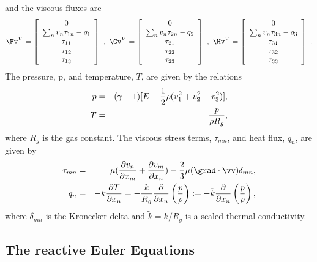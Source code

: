 \documentclass{article}
\begin{document}
and the viscous fluxes are
$$
 \Fv^V = \left[ \begin{array}{c}
    0 \\ \sum_n v_n\tau_{1n}-q_1
      \\ \tau_{11} \\  \tau_{12} \\ \tau_{13}
                \end{array}\right]  ~,~
 \Gv^V = \left[ \begin{array}{c}
    0 \\ \sum_n v_n\tau_{2n}-q_2
      \\ \tau_{21} \\  \tau_{22} \\ \tau_{23}
                \end{array}\right] ~,~
 \Hv^V = \left[ \begin{array}{c}
    0 \\ \sum_n v_n\tau_{3n}-q_3
      \\ \tau_{31} \\  \tau_{32} \\ \tau_{33}
                \end{array}\right]   ~.
$$
The pressure, p, and temperature, $T$, are given by the relations
\begin{eqnarray*}
   p &=& (\gamma-1)[ E - {1\over2} \rho (v_1^2+v_2^2+v_3^2) ], \\
   T &=& {p\over\rho R_g},
\end{eqnarray*}
where $R_g$ is the gas constant.
The viscous stress terms, $\tau_{mn}$, and heat flux, $q_n$, are given by
\begin{eqnarray*}
  \tau_{mn} &=&  \mu( {\partial v_n \over\partial x_m}
                     +{\partial v_m \over\partial x_n}     )
            - {2\over3}\mu( \grad\cdot\vv ) \delta_{mn}, \\
   q_n &=& -k {\partial T \over \partial x_n}
  =   -{k\over R_g} {\partial \over \partial x_n}
      \left({p\over\rho}\right)
  := -{\tilde{k}} {\partial \over \partial x_n}
      \left({p\over\rho}\right),
\end{eqnarray*}
where $\delta_{mn}$ is the Kronecker delta and $\tilde{k}=k/R_g$
is a scaled thermal conductivity.

\subsection{The reactive Euler Equations} \label{sec:Euler}
\end{document}
